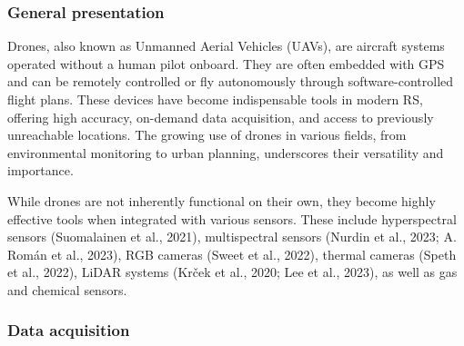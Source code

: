 \documentclass[
  letterpaper,
  11pt,
  english,
  singlespacing,
  headsepline]{MastersDoctoralThesis}
\begin{document}
\begin{spacing}{1.5}
\subsubsection{General presentation}\label{sec-Drones}

Drones, also known as Unmanned Aerial Vehicles (UAVs), are aircraft
systems operated without a human pilot onboard. They are often embedded
with GPS and can be remotely controlled or fly autonomously through
software-controlled flight plans. These devices have become
indispensable tools in modern RS, offering high accuracy, on-demand data
acquisition, and access to previously unreachable locations. The growing
use of drones in various fields, from environmental monitoring to urban
planning, underscores their versatility and importance.

While drones are not inherently functional on their own, they become
highly effective tools when integrated with various sensors. These
include hyperspectral sensors (Suomalainen et al., 2021), multispectral
sensors (Nurdin et al., 2023; A. Román et al., 2023), RGB cameras (Sweet
et al., 2022), thermal cameras (Speth et al., 2022), LiDAR systems
(Krček et al., 2020; Lee et al., 2023), as well as gas and chemical
sensors.

\subsubsection{Data acquisition}\label{data-acquisition}

\begin{figure}

\end{figure}
\end{spacing}
\end{document}
